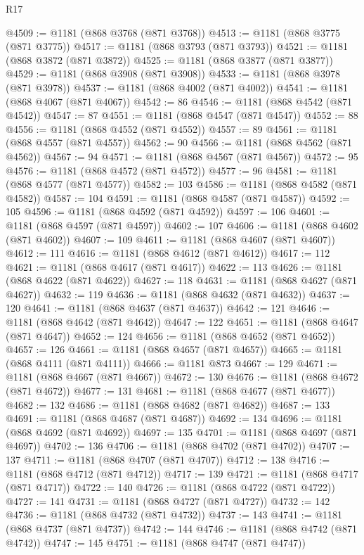 \begin{lexlean}{R17}
\begin{coremodule}
@4509 := @1181 (@868 @3768 (@871 @3768))
@4513 := @1181 (@868 @3775 (@871 @3775))
@4517 := @1181 (@868 @3793 (@871 @3793))
@4521 := @1181 (@868 @3872 (@871 @3872))
@4525 := @1181 (@868 @3877 (@871 @3877))
@4529 := @1181 (@868 @3908 (@871 @3908))
@4533 := @1181 (@868 @3978 (@871 @3978))
@4537 := @1181 (@868 @4002 (@871 @4002))
@4541 := @1181 (@868 @4067 (@871 @4067))
@4542 := 86
@4546 := @1181 (@868 @4542 (@871 @4542))
@4547 := 87
@4551 := @1181 (@868 @4547 (@871 @4547))
@4552 := 88
@4556 := @1181 (@868 @4552 (@871 @4552))
@4557 := 89
@4561 := @1181 (@868 @4557 (@871 @4557))
@4562 := 90
@4566 := @1181 (@868 @4562 (@871 @4562))
@4567 := 94
@4571 := @1181 (@868 @4567 (@871 @4567))
@4572 := 95
@4576 := @1181 (@868 @4572 (@871 @4572))
@4577 := 96
@4581 := @1181 (@868 @4577 (@871 @4577))
@4582 := 103
@4586 := @1181 (@868 @4582 (@871 @4582))
@4587 := 104
@4591 := @1181 (@868 @4587 (@871 @4587))
@4592 := 105
@4596 := @1181 (@868 @4592 (@871 @4592))
@4597 := 106
@4601 := @1181 (@868 @4597 (@871 @4597))
@4602 := 107
@4606 := @1181 (@868 @4602 (@871 @4602))
@4607 := 109
@4611 := @1181 (@868 @4607 (@871 @4607))
@4612 := 111
@4616 := @1181 (@868 @4612 (@871 @4612))
@4617 := 112
@4621 := @1181 (@868 @4617 (@871 @4617))
@4622 := 113
@4626 := @1181 (@868 @4622 (@871 @4622))
@4627 := 118
@4631 := @1181 (@868 @4627 (@871 @4627))
@4632 := 119
@4636 := @1181 (@868 @4632 (@871 @4632))
@4637 := 120
@4641 := @1181 (@868 @4637 (@871 @4637))
@4642 := 121
@4646 := @1181 (@868 @4642 (@871 @4642))
@4647 := 122
@4651 := @1181 (@868 @4647 (@871 @4647))
@4652 := 124
@4656 := @1181 (@868 @4652 (@871 @4652))
@4657 := 126
@4661 := @1181 (@868 @4657 (@871 @4657))
@4665 := @1181 (@868 @4111 (@871 @4111))
@4666 := @1181 @873
@4667 := 129
@4671 := @1181 (@868 @4667 (@871 @4667))
@4672 := 130
@4676 := @1181 (@868 @4672 (@871 @4672))
@4677 := 131
@4681 := @1181 (@868 @4677 (@871 @4677))
@4682 := 132
@4686 := @1181 (@868 @4682 (@871 @4682))
@4687 := 133
@4691 := @1181 (@868 @4687 (@871 @4687))
@4692 := 134
@4696 := @1181 (@868 @4692 (@871 @4692))
@4697 := 135
@4701 := @1181 (@868 @4697 (@871 @4697))
@4702 := 136
@4706 := @1181 (@868 @4702 (@871 @4702))
@4707 := 137
@4711 := @1181 (@868 @4707 (@871 @4707))
@4712 := 138
@4716 := @1181 (@868 @4712 (@871 @4712))
@4717 := 139
@4721 := @1181 (@868 @4717 (@871 @4717))
@4722 := 140
@4726 := @1181 (@868 @4722 (@871 @4722))
@4727 := 141
@4731 := @1181 (@868 @4727 (@871 @4727))
@4732 := 142
@4736 := @1181 (@868 @4732 (@871 @4732))
@4737 := 143
@4741 := @1181 (@868 @4737 (@871 @4737))
@4742 := 144
@4746 := @1181 (@868 @4742 (@871 @4742))
@4747 := 145
@4751 := @1181 (@868 @4747 (@871 @4747))

\end{coremodule}
\end{lexlean}

